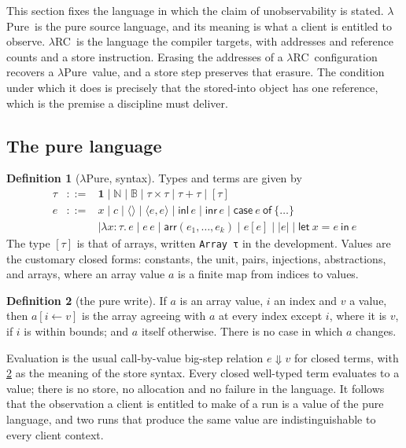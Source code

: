 \documentclass[11pt,a4paper]{article}
\theoremstyle{definition}
\newtheorem{definition}{Definition}[section]
\theoremstyle{plain}
\newcommand{\lrc}{\textup{$\lambda$RC}}
\newcommand{\lpure}{\textup{$\lambda$Pure}}
\newcommand{\code}[1]{\texttt{#1}}
\begin{document}
This section fixes the language in which the claim of unobservability is
stated. \lpure\ is the pure source language, and its meaning is what a client is
entitled to observe. \lrc\ is the language the compiler targets, with addresses
and reference counts and a store instruction. Erasing the addresses of a \lrc\
configuration recovers a \lpure\ value, and a store step preserves that erasure.
The condition under which it does is precisely that the stored-into object has
one reference, which is the premise a discipline must deliver.

\subsection{The pure language}

\begin{definition}[\lpure, syntax]
Types and terms are given by
\[
\begin{array}{rcl}
\tau & ::= & \mathbf{1} \mid \mathbb{N} \mid \mathbb{B} \mid \tau \times \tau \mid \tau + \tau \mid [\tau] \\[2pt]
e & ::= & x \mid c \mid \langle\rangle \mid \langle e, e \rangle \mid \mathsf{inl}\, e \mid \mathsf{inr}\, e \mid \mathsf{case}\ e\ \mathsf{of}\ \{\dots\} \\
 & & \mid \lambda x{:}\tau.\, e \mid e\,e \mid \mathsf{arr}(e_1,\dots,e_k) \mid e[e] \mid {|e|} \mid \mathsf{let}\ x = e\ \mathsf{in}\ e
\end{array}
\]
The type $[\tau]$ is that of arrays, written \code{Array τ} in the development.
Values are the customary closed forms: constants, the unit, pairs, injections,
abstractions, and arrays, where an array value $a$ is a finite map from indices
to values.
\end{definition}

\begin{definition}[the pure write]\label{def:set}
If $a$ is an array value, $i$ an index and $v$ a value, then
$a[i \leftarrow v]$ is the array agreeing with $a$ at every index except $i$,
where it is $v$, if $i$ is within bounds; and $a$ itself otherwise. There is no
case in which $a$ changes.
\end{definition}

Evaluation is the usual call-by-value big-step relation $e \Downarrow v$ for
closed terms, with \cref{def:set} as the meaning of the store syntax. Every
closed well-typed term evaluates to a value; there is no store, no allocation
and no failure in the language. It follows that the observation a client is
entitled to make of a run is a value of the pure language, and two runs that
produce the same value are indistinguishable to every client context.
\end{document}
